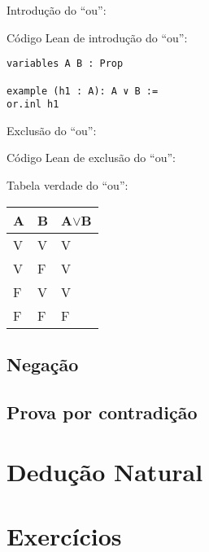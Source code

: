 Introdução do ``ou'':
\begin{prooftree}
\end{prooftree}

Código Lean de introdução do ``ou'':
\begin{lstlisting} 
variables A B : Prop

example (h1 : A): A ∨ B :=
or.inl h1
\end{lstlisting} 

Exclusão do ``ou'': 


\begin{prooftree}
\end{prooftree}
     
Código Lean de exclusão do ``ou'':

Tabela verdade do ``ou'':


\begin{table}[htb]
\begin{tabular}{|l|l|l|}
\hline
\textbf{A} & \textbf{B} & \textbf{A$\lor$B} \\ \hline
V          & V          & V                 \\ \hline
V          & F          & V                 \\ \hline
F          & V          & V                 \\ \hline
F          & F          & F                 \\ \hline
\end{tabular}
\end{table}

\subsection{Negação}
\subsection{Prova por contradição}

\section{Dedução Natural}

\section{Exercícios}
